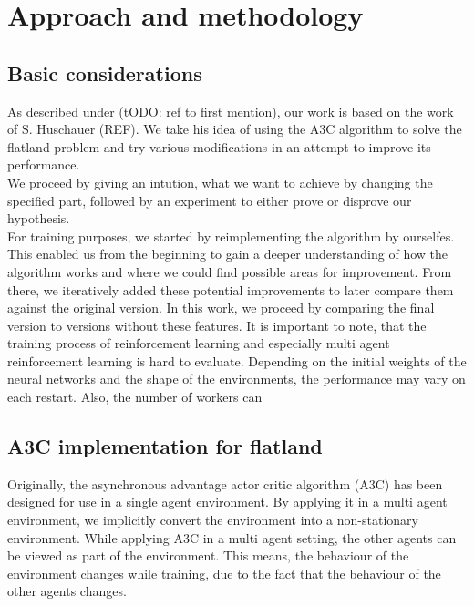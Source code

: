 %
%

\chapter{Approach and methodology}\label{chap.vorgehen}
\section{Basic considerations}\label{basic_cons}
As described under (tODO: ref to first mention), our work is based on the work of S. Huschauer (REF). We take his idea of using the A3C algorithm to solve the flatland problem and try various modifications in an attempt to improve its performance. \\We proceed by giving an intution, what we want to achieve by changing the specified part, followed by an experiment to either prove or disprove our hypothesis.\\
For training purposes, we started by reimplementing the algorithm by ourselfes. This enabled us from the beginning to gain a deeper understanding of how the algorithm works and where we could find possible areas for improvement. From there, we iteratively added these potential improvements to later compare them against the original version.
In this work, we proceed by comparing the final version to versions without these features. 
It is important to note, that the training process of reinforcement learning and especially multi agent reinforcement learning is hard to evaluate. Depending on the initial weights of the neural networks and the shape of the environments, the performance may vary on each restart. Also, the number of workers can 


\section{A3C implementation for flatland}\label{enhanced_observations}
Originally, the asynchronous advantage actor critic algorithm (A3C) has been designed for use in a single agent environment.
By applying it in a multi agent environment, we implicitly convert the environment into a non-stationary environment.
While applying A3C in a multi agent setting, the other agents can be viewed as part of the environment. This means, the behaviour of the environment changes while training, due to the fact that the behaviour of the other agents changes. 

